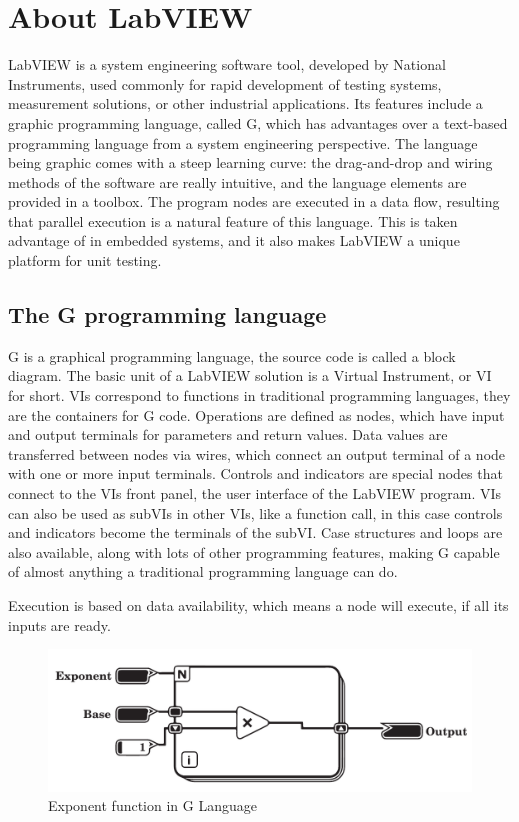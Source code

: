 \section{About LabVIEW}
LabVIEW is a system engineering software tool, developed by National Instruments, used commonly for rapid development of testing systems, measurement solutions, or other industrial applications. Its features include a graphic programming language, called G, which has advantages over a text-based programming language from a system engineering perspective. The language being graphic comes with a steep learning curve: the drag-and-drop and wiring methods of the software are really intuitive, and the language elements are provided in a toolbox. The program nodes are executed in a data flow, resulting that parallel execution is a natural feature of this language. This is taken advantage of in embedded systems, and it also makes LabVIEW a unique platform for unit testing.
\subsection{The G programming language}
G is a graphical programming language, the source code is called a block diagram. The basic unit of a LabVIEW solution is a Virtual Instrument, or VI for short. VIs correspond to functions in traditional programming languages, they are the containers for G code. Operations are defined as nodes, which have input and output terminals for parameters and return values. Data values are transferred between nodes via wires, which connect an output terminal of a node with one or more input terminals. Controls and indicators are special nodes that connect to the VIs front panel, the user interface of the LabVIEW program. VIs can also be used as subVIs in other VIs, like a function call, in this case controls and indicators become the terminals of the subVI. Case structures and loops are also available, along with lots of other programming features, making G capable of almost anything a traditional programming language can do.

Execution is based on data availability, which means a node will execute, if all its inputs are ready. 
\begin{figure}

\includegraphics[width=150mm,keepaspectratio]{figures/vi2.pdf}
\caption{Exponent function in G Language} 
\label{fig:gexponent}
\end{figure}

